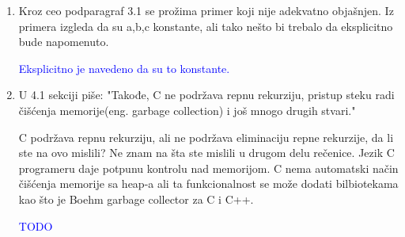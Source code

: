 \documentclass[a4paper]{report}
\newcommand{\odgovor}[1]{\textcolor{blue}{#1}}
\begin{document}
\begin{enumerate}
		\item Kroz ceo podparagraf 3.1 se prožima primer koji nije adekvatno objašnjen. Iz primera izgleda da su a,b,c konstante, ali tako nešto bi trebalo da eksplicitno bude napomenuto.
		
		\odgovor{Eksplicitno je navedeno da su to konstante.}
		
		\item U 4.1 sekciji piše:
		"Takođe, C ne podržava repnu rekurziju, pristup steku radi čišćenja memorije(eng. garbage collection) i još mnogo drugih stvari."
		
		C podržava repnu rekurziju, ali ne podržava eliminaciju repne rekurzije, da li ste na ovo mislili? Ne znam na šta ste mislili u drugom delu rečenice. Jezik C programeru daje potpunu kontrolu nad memorijom. C nema automatski način čišćenja memorije sa heap-a ali ta funkcionalnost se može dodati bilbiotekama kao što je Boehm garbage collector za C i C++.
		
		\odgovor{TODO}
		
		
	\end{enumerate}
	
\end{document}
